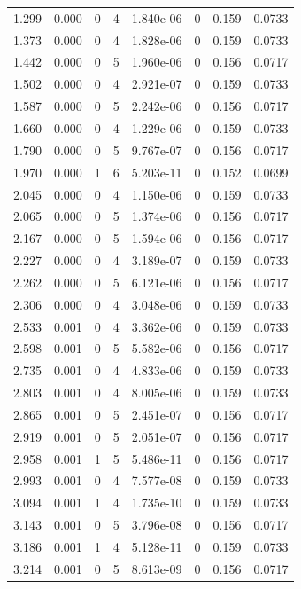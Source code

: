 \documentclass[preview]{standalone}
\begin{document}
{{\begin{tabular}{L{1.2cm}C{1.2cm} C{0.3cm}C{0.5cm} C{1.4cm}C{1.4cm} C{1.4cm}C{1.4cm}}
  1.299  &  0.000  & 0     &  4 &  1.840e-06  & 0  & 0.159 &  0.0733   \\ 
  1.373  &  0.000  & 0     &  4 &  1.828e-06  & 0  & 0.159 &  0.0733   \\ 
  1.442  &  0.000  & 0     &  5 &  1.960e-06  & 0  & 0.156 &  0.0717   \\ 
  1.502  &  0.000  & 0     &  4 &  2.921e-07  & 0  & 0.159 &  0.0733   \\ 
  1.587  &  0.000  & 0     &  5 &  2.242e-06  & 0  & 0.156 &  0.0717   \\ 
  1.660  &  0.000  & 0     &  4 &  1.229e-06  & 0  & 0.159 &  0.0733   \\ 
  1.790  &  0.000  & 0     &  5 &  9.767e-07  & 0  & 0.156 &  0.0717   \\ 
  1.970  &  0.000  & 1     &  6 &  5.203e-11  & 0  & 0.152 &  0.0699   \\ 
  2.045  &  0.000  & 0     &  4 &  1.150e-06  & 0  & 0.159 &  0.0733   \\ 
  2.065  &  0.000  & 0     &  5 &  1.374e-06  & 0  & 0.156 &  0.0717   \\ 
  2.167  &  0.000  & 0     &  5 &  1.594e-06  & 0  & 0.156 &  0.0717   \\ 
  2.227  &  0.000  & 0     &  4 &  3.189e-07  & 0  & 0.159 &  0.0733   \\ 
  2.262  &  0.000  & 0     &  5 &  6.121e-06  & 0  & 0.156 &  0.0717   \\ 
  2.306  &  0.000  & 0     &  4 &  3.048e-06  & 0  & 0.159 &  0.0733   \\ 
  2.533  &  0.001  & 0     &  4 &  3.362e-06  & 0  & 0.159 &  0.0733   \\ 
  2.598  &  0.001  & 0     &  5 &  5.582e-06  & 0  & 0.156 &  0.0717   \\ 
  2.735  &  0.001  & 0     &  4 &  4.833e-06  & 0  & 0.159 &  0.0733   \\ 
  2.803  &  0.001  & 0     &  4 &  8.005e-06  & 0  & 0.159 &  0.0733   \\ 
  2.865  &  0.001  & 0     &  5 &  2.451e-07  & 0  & 0.156 &  0.0717   \\ 
  2.919  &  0.001  & 0     &  5 &  2.051e-07  & 0  & 0.156 &  0.0717   \\ 
  2.958  &  0.001  & 1     &  5 &  5.486e-11  & 0  & 0.156 &  0.0717   \\ 
  2.993  &  0.001  & 0     &  4 &  7.577e-08  & 0  & 0.159 &  0.0733   \\ 
  3.094  &  0.001  & 1     &  4 &  1.735e-10  & 0  & 0.159 &  0.0733   \\ 
  3.143  &  0.001  & 0     &  5 &  3.796e-08  & 0  & 0.156 &  0.0717   \\ 
  3.186  &  0.001  & 1     &  4 &  5.128e-11  & 0  & 0.159 &  0.0733   \\ 
  3.214  &  0.001  & 0     &  5 &  8.613e-09  & 0  & 0.156 &  0.0717   \\ 
\hline 
\end{tabular} 

}}
\end{document}
